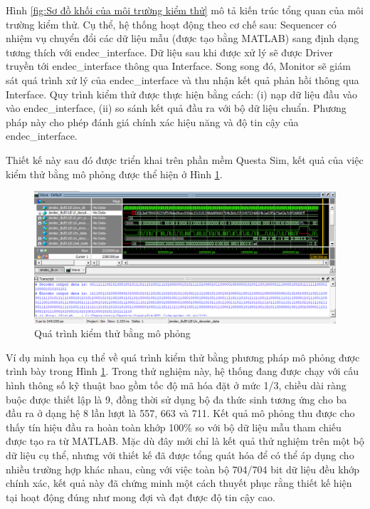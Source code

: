 \documentclass[../DoAn.tex]{subfiles}
\begin{document}
Hình \ref{fig:Sơ đồ khối của môi trường kiểm thử} mô tả kiến trúc tổng quan của môi trường kiểm thử. Cụ thể, hệ thống hoạt động theo cơ chế sau: Sequencer có nhiệm vụ chuyển đổi các dữ liệu mẫu (được tạo bằng MATLAB) sang định dạng tương thích với endec\_interface. Dữ liệu sau khi được xử lý sẽ được Driver truyền tới endec\_interface thông qua Interface. Song song đó, Monitor sẽ giám sát quá trình xử lý của endec\_interface và thu nhận kết quả phản hồi thông qua Interface. Quy trình kiểm thử được thực hiện bằng cách: (i) nạp dữ liệu đầu vào vào endec\_interface, (ii) so sánh kết quả đầu ra với bộ dữ liệu chuẩn. Phương pháp này cho phép đánh giá chính xác hiệu năng và độ tin cậy của endec\_interface.

Thiết kế này sau đó được triển khai trên phần mềm Questa Sim, kết quả của việc kiểm thử bằng mô phỏng được thể hiện ở Hình \ref{fig:Quá trình kiểm thử bằng mô phỏng}.

\begin{figure}[H]
    \centering
    \includegraphics[width=\textwidth, height=0.33\textheight, keepaspectratio]{Hinhve/Chuong 4/simulation.png}
    \caption{Quá trình kiểm thử bằng mô phỏng}
    \label{fig:Quá trình kiểm thử bằng mô phỏng}
\end{figure}

Ví dụ minh họa cụ thể về quá trình kiểm thử bằng phương pháp mô phỏng được trình bày trong Hình \ref{fig:Quá trình kiểm thử bằng mô phỏng}. Trong thử nghiệm này, hệ thống đang được chạy với cấu hình thông số kỹ thuật bao gồm tốc độ mã hóa đặt ở mức 1/3, chiều dài ràng buộc được thiết lập là 9, đồng thời sử dụng bộ đa thức sinh tương ứng cho ba đầu ra ở dạng hệ 8 lần lượt là 557, 663 và 711. Kết quả mô phỏng thu được cho thấy tín hiệu đầu ra hoàn toàn khớp 100\% so với bộ dữ liệu mẫu tham chiếu được tạo ra từ MATLAB. Mặc dù đây mới chỉ là kết quả thử nghiệm trên một bộ dữ liệu cụ thể, nhưng với thiết kế đã được tổng quát hóa để có thể áp dụng cho nhiều trường hợp khác nhau, cùng với việc toàn bộ 704/704 bit dữ liệu đều khớp chính xác, kết quả này đã chứng minh một cách thuyết phục rằng thiết kế hiện tại hoạt động đúng như mong đợi và đạt được độ tin cậy cao.  
\end{document}
